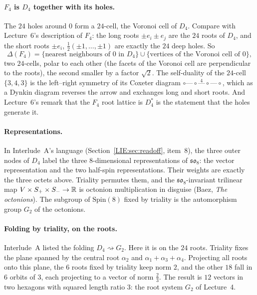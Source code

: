 \paragraph{$F_4$ is $D_4$ together with its holes.} The $24$ holes around $0$ form a $24$-cell, the Voronoi
cell of $D_4$. Compare with Lecture~6's description of $F_4$: the long roots $\pm e_i\pm e_j$ are the
$24$ roots of $D_4$, and the short roots $\pm e_i$, $\frac12(\pm1,\dots,\pm1)$ are exactly the $24$ deep
holes. So
\[
  \Delta(F_4)=\{\text{nearest neighbours of }0\text{ in }D_4\}\cup\{\text{vertices of the Voronoi cell of }0\},
\]
two $24$-cells, polar to each other (the facets of the Voronoi cell are perpendicular to the roots), the
second smaller by a factor $\sqrt2$. The self-duality of the
$24$-cell $\{3,4,3\}$ is the left--right symmetry of its Coxeter diagram
$\circ\text{---}\circ\overset{4}{\text{---}}\circ\text{---}\circ$, which as a Dynkin diagram reverses the
arrow and exchanges long and short roots. And Lecture~6's remark that the $F_4$ root lattice is
$D_4^*$ is the statement that the holes generate it.

\paragraph{Representations.} In Interlude~A's language (Section~\ref{LIE:sec:readoff}, item~8), the three
outer nodes of $D_4$ label the three $8$-dimensional representations of $\mathfrak{so}_8$: the vector
representation and the two half-spin representations. Their weights are exactly the three octets above.
Triality permutes them, and the $\mathfrak{so}_8$-invariant trilinear map
$V\times S_+\times S_-\to\mathbb{R}$ is octonion multiplication in disguise (Baez, \emph{The octonions}). The
subgroup of $\mathrm{Spin}(8)$ fixed by triality is the automorphism group $G_2$ of the octonions.

\paragraph{Folding by triality, on the roots.} Interlude~A listed the folding $D_4\rightsquigarrow G_2$.
Here it is on the $24$ roots. Triality fixes the plane spanned by the central root $\alpha_2$ and
$\alpha_1+\alpha_3+\alpha_4$. Projecting all roots onto this plane, the $6$ roots fixed by triality keep
norm $2$, and the other $18$ fall in $6$ orbits of $3$, each projecting to a vector of norm $\frac23$. The
result is $12$ vectors in two hexagons with squared length ratio $3$: the root system $G_2$ of
Lecture~4.

